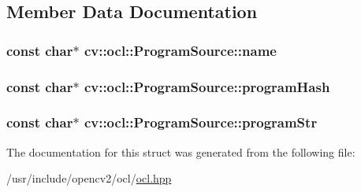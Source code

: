 \subsection{Member Data Documentation}
\hypertarget{structcv_1_1ocl_1_1ProgramSource_a5594acd1689f16d68635ec3ded859a1a}{
\subsubsection[{name}]{\setlength{\rightskip}{0pt plus 5cm}const char$\ast$ cv\-::ocl\-::\-Program\-Source\-::name}}\label{structcv_1_1ocl_1_1ProgramSource_a5594acd1689f16d68635ec3ded859a1a}
\hypertarget{structcv_1_1ocl_1_1ProgramSource_a2c8f26d71aafa233ed5977d050a236c1}{
\subsubsection[{program\-Hash}]{\setlength{\rightskip}{0pt plus 5cm}const char$\ast$ cv\-::ocl\-::\-Program\-Source\-::program\-Hash}}\label{structcv_1_1ocl_1_1ProgramSource_a2c8f26d71aafa233ed5977d050a236c1}
\hypertarget{structcv_1_1ocl_1_1ProgramSource_a5fec696b43b01c9acf7ec9044a7d4aae}{
\subsubsection[{program\-Str}]{\setlength{\rightskip}{0pt plus 5cm}const char$\ast$ cv\-::ocl\-::\-Program\-Source\-::program\-Str}}\label{structcv_1_1ocl_1_1ProgramSource_a5fec696b43b01c9acf7ec9044a7d4aae}


The documentation for this struct was generated from the following file\-:\begin{DoxyCompactItemize}
\item 
/usr/include/opencv2/ocl/\hyperlink{ocl_2ocl_8hpp}{ocl.\-hpp}\end{DoxyCompactItemize}
